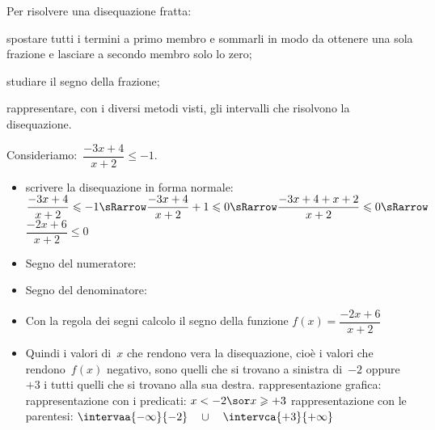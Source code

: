 \begin{procedura}{}{}
Per risolvere una disequazione fratta:
\begin{enumeratea}
\item spostare tutti i termini a primo membro e sommarli in modo da 
ottenere una sola frazione e lasciare a secondo membro solo lo zero;
\item studiare il segno della frazione;
\item rappresentare, con i diversi metodi visti, 
gli intervalli che risolvono la disequazione.
\end{enumeratea}
\end{procedura}

\begin{esempio}{}{}
Consideriamo:~\(\dfrac{-3 x +4}{x+2} \leqslant-1\).
\begin{itemize} [noitemsep, left=0mm]
\item scrivere la disequazione in forma normale:\\ [.5em]
\(\dfrac{-3 x +4}{x+2} \leqslant -1 \sRarrow 
\dfrac{-3 x +4}{x+2} +1 \leqslant 0 \sRarrow
\dfrac{-3 x +4 + x +2}{x+2} \leqslant 0 \sRarrow \)
\(\dfrac{-2 x +6}{x+2} \leqslant0\)\\
\item Segno del numeratore:\\
\hspace*{-5mm} 
\item Segno del denominatore:\\
\hspace*{-5mm} 
\item Con la regola dei segni calcolo il segno della funzione 
\(f(x) = \dfrac{-2 x +6}{x+2}\) 

\segnofratta
\item Quindi i valori di~\(x\) che rendono vera la disequazione, cioè i 
valori
che rendono~\(f(x)\) negativo, sono quelli 
che si trovano a sinistra di~\(-2\) oppure \(+3\) i tutti quelli che si 
trovano alla sua destra. 
\subitem rappresentazione grafica: 
\subitem rappresentazione con i predicati: \quad \(x < -2 \sor x 
\geqslant +3\) 
\subitem rappresentazione con le parentesi: \quad 
\(\intervaa{-\infty}{-2} \quad \cup \quad \intervca{+3}{+\infty}\) 
\end{itemize}
\end{esempio}

